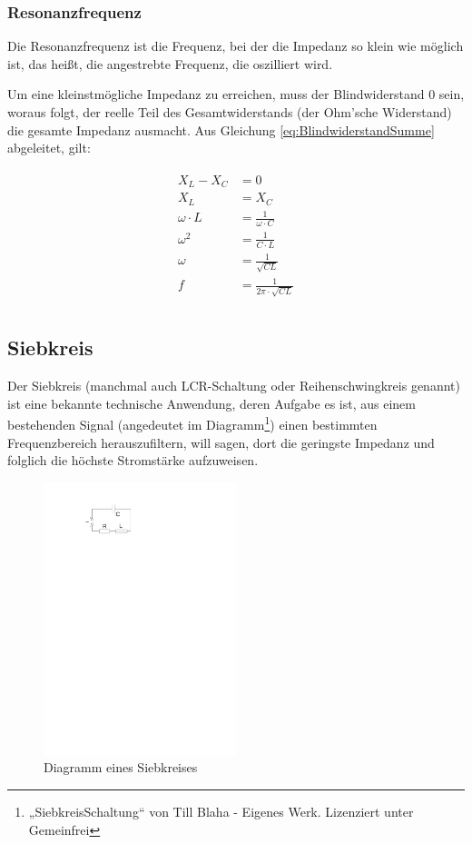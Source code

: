 \subsubsection{Resonanzfrequenz}

Die Resonanzfrequenz ist die Frequenz, bei der die Impedanz so klein wie möglich ist, das heißt, die angestrebte Frequenz, die oszilliert wird.

Um eine kleinstmögliche Impedanz zu erreichen, muss der Blindwiderstand $0$ sein, woraus folgt, der reelle Teil des Gesamtwiderstands (der Ohm'sche Widerstand) die gesamte Impedanz ausmacht. Aus Gleichung \ref{eq:BlindwiderstandSumme} abgeleitet, gilt:

\begin{align}	\label{eq:ResonanzfrequenzSchwingkreis}
\begin{split}
	X_L - X_C &= 0 \\
	X_L &= X_C \\
	\omega \cdot L &= \frac{1}{\omega \cdot C} \\
	\omega ^2 &= \frac{1}{C \cdot L} \\
	\omega &= \frac{1}{\sqrt{C L}} \\	
	f &= \frac{1}{2 \pi \cdot \sqrt{C L}} \\
\end{split}
\end{align}


\subsection{Siebkreis}

Der Siebkreis (manchmal auch LCR-Schaltung oder Reihenschwingkreis genannt) ist eine bekannte technische Anwendung, deren Aufgabe es ist, aus einem bestehenden Signal (angedeutet im Diagramm\footnote{„SiebkreisSchaltung“ von Till Blaha - Eigenes Werk. Lizenziert unter Gemeinfrei}) einen bestimmten Frequenzbereich \glqq herauszufiltern\grqq , will sagen, dort die geringste Impedanz und folglich die höchste Stromstärke aufzuweisen.

\begin{figure}[h!]
	\centering
	\includegraphics[width=0.5\textwidth]{Pictures/Siebkreis}
	\caption{Diagramm eines Siebkreises}
\end{figure}

